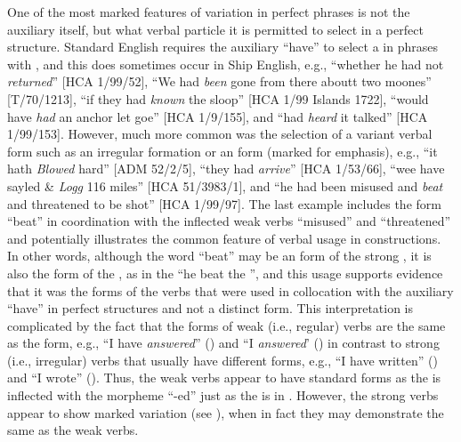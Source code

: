 One of the most marked features of variation in perfect  phrases is not the auxiliary itself, but what verbal particle it is permitted to select in a perfect structure. Standard English requires the auxiliary “have” to select a  in  phrases with , and this does sometimes occur in Ship English, e.g., “whether he had not \textit{returned}” [HCA 1/99/52], “We had \textit{been} gone from there aboutt two moones” [T/70/1213], “if they had \textit{known} the sloop” [HCA 1/99  Islands 1722], “would have \textit{had} an anchor let goe” [HCA 1/9/155], and “had \textit{heard} it talked” [HCA 1/99/153]. However, much more common was the selection of a variant verbal form such as an irregular formation or an  form (marked for emphasis), e.g., “it hath \textit{Blowed} hard” [ADM 52/2/5], “they had \textit{arrive}” [HCA 1/53/66], “wee have sayled \& \textit{Logg} 116 miles” [HCA 51/3983/1], and “he had been misused and \textit{beat} and threatened to be shot” [HCA 1/99/97]. The last example includes the  form “beat” in coordination with the inflected weak verbs “misused” and “threatened” and potentially illustrates the common feature of  verbal usage in  constructions. In other words, although the word “beat” may be an  form of the strong , it is also the form of the , as in the  “he beat the ”, and this usage supports evidence that it was the  forms of the verbs that were used in collocation with the auxiliary “have” in perfect structures and not a distinct  form. This interpretation is complicated by the fact that the  forms of weak (i.e., regular) verbs are the same as the  form, e.g., “I have \textit{answered}” () and “I \textit{answered}’ () in contrast to strong (i.e., irregular) verbs that usually have different  forms, e.g., “I have written” () and “I wrote” (). Thus, the weak verbs appear to have standard  forms as the  is inflected with the morpheme “-ed” just as the  is in . However, the strong verbs appear to show marked variation (see ), when in fact they may demonstrate the same  as the weak verbs. 

